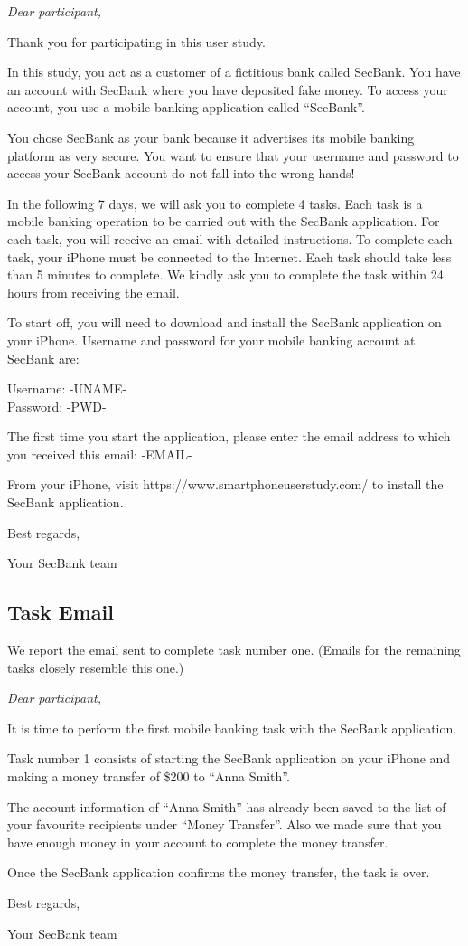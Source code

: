 {\itshape
Dear participant,

Thank you for participating in this user study.

In this study, you act as a customer of a fictitious bank called SecBank.
You have an account with SecBank where you have deposited fake money.
To access your account, you use a mobile banking application called ``SecBank''.

You chose SecBank as your bank because it advertises its mobile banking platform as very secure.
You want to ensure that your username and password to access your SecBank account do not fall into the wrong hands!

In the following 7 days, we will ask you to complete 4 tasks.
Each task is a mobile banking operation to be carried out with the SecBank application.
For each task, you will receive an email with detailed instructions.
To complete each task, your iPhone must be connected to the Internet.
Each task should take less than 5 minutes to complete.
We kindly ask you to complete the task within 24 hours from receiving the email.

To start off, you will need to download and install the SecBank application on your iPhone.
Username and password for your mobile banking account at SecBank are:

Username: -UNAME-\\
Password: -PWD-

The first time you start the application, please enter the email address to which you received this email: -EMAIL-

From your iPhone, visit https://www.smartphoneuserstudy.com/ to install the SecBank application.

Best regards,

Your SecBank team}

\subsection{Task Email}
\label{app:sp_phishing_taskemail}
We report the email sent to complete task number one. (Emails for the remaining tasks closely resemble this one.)

{\itshape
Dear participant,

It is time to perform the first mobile banking task with the SecBank application.

Task number 1 consists of starting the SecBank application on your iPhone and making a money transfer of \$200 to ``Anna Smith''.

The account information of ``Anna Smith'' has already been saved to the list of your favourite recipients under ``Money Transfer''.
Also we made sure that you have enough money in your account to complete the money transfer.

Once the SecBank application confirms the money transfer, the task is over.

Best regards,

Your SecBank team}


